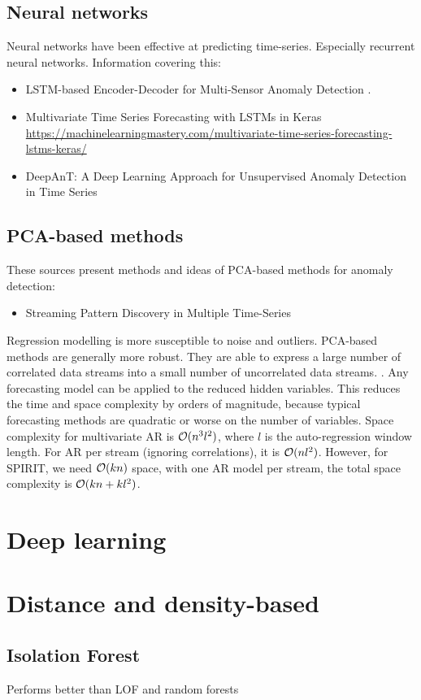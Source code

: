 \subsection{Neural networks} Neural networks have been effective at predicting time-series. Especially recurrent neural networks. Information covering this:
\begin{itemize}
    \item LSTM-based Encoder-Decoder for Multi-Sensor Anomaly Detection \cite{Malhotra2016a}.
    \item Multivariate Time Series Forecasting with LSTMs in Keras \newline \url{https://machinelearningmastery.com/multivariate-time-series-forecasting-lstms-keras/}
    \item DeepAnT: A Deep Learning Approach for Unsupervised Anomaly Detection in Time Series \cite{Munir2019DeepAnT:Series}
\end{itemize}


\subsection{PCA-based methods} These sources present methods and ideas of PCA-based methods for anomaly detection:
\begin{itemize}
    \item Streaming Pattern Discovery in Multiple Time-Series \cite{Papadimitriou2005StreamingTime-series}
\end{itemize}

Regression modelling is more susceptible to noise and outliers. PCA-based methods are generally more robust. They are able to express a large number of correlated data streams into a small number of uncorrelated data streams. \cite{Aggarwal2013a}. Any forecasting model can be applied to the reduced hidden variables. This reduces the time and space complexity by orders of magnitude, because typical forecasting methods are quadratic or worse on the number of variables. Space complexity for multivariate AR is $\mathcal{O}{(n^3l^2)}$, where $l$ is the auto-regression window length. For AR per stream (ignoring correlations), it is $\mathcal{O}{(nl^2)}$. However, for SPIRIT, we need $\mathcal{O}{(kn)}$ space, with one AR model per stream, the total space complexity is $\mathcal{O}{(kn+kl^2)}$. \cite{Papadimitriou2005StreamingTime-series}


\section{Deep learning}



\section{Distance and density-based}

\subsection{Isolation Forest}
Performs better than LOF and random forests
